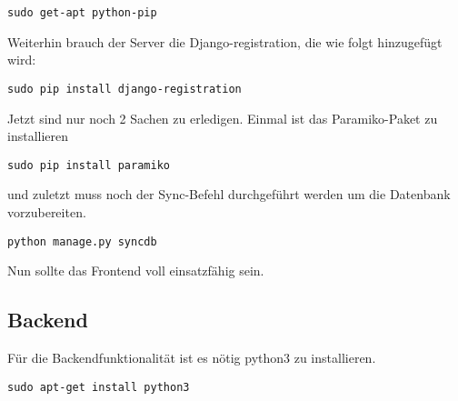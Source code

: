 \begin{lstlisting}
sudo get-apt python-pip
\end{lstlisting}
Weiterhin brauch der Server die Django-registration, die wie folgt hinzugefügt wird:
\begin{lstlisting}
sudo pip install django-registration
\end{lstlisting}
Jetzt sind nur noch 2 Sachen zu erledigen. Einmal ist das Paramiko-Paket zu installieren 
\begin{lstlisting}
sudo pip install paramiko
\end{lstlisting}
und zuletzt muss noch der Sync-Befehl durchgeführt werden um die Datenbank vorzubereiten.
\begin{lstlisting}
python manage.py syncdb
\end{lstlisting}
Nun sollte das Frontend voll einsatzfähig sein.
\subsection{Backend}
Für die Backendfunktionalität ist es nötig python3 zu installieren.
\begin{lstlisting}
sudo apt-get install python3
\end{lstlisting}


